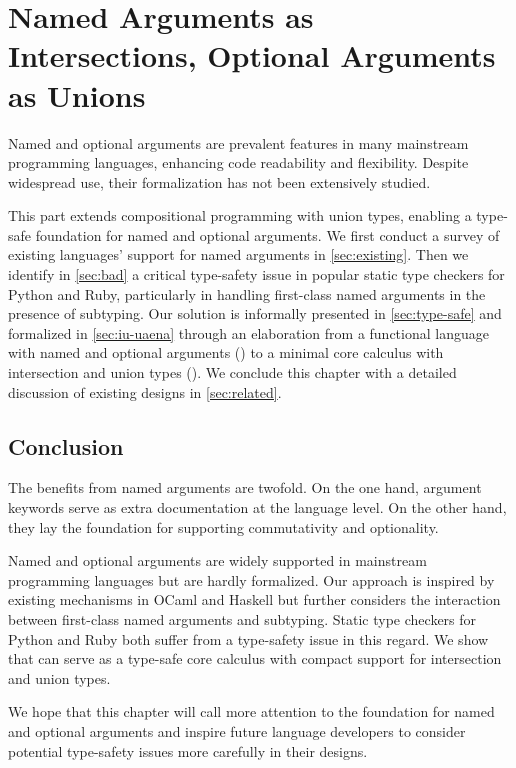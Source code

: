 \chapter{Named Arguments as Intersections, Optional Arguments as Unions} \label{ch:arguments}

Named and optional arguments are prevalent features in many mainstream
programming languages, enhancing code readability and flexibility. Despite
widespread use, their formalization has not been extensively studied.

This part extends compositional programming with union types, enabling a
type-safe foundation for named and optional arguments. We first conduct a survey
of existing languages' support for named arguments in \autoref{sec:existing}.
Then we identify in \autoref{sec:bad} a critical type-safety issue in popular
static type checkers for Python and Ruby, particularly in handling first-class
named arguments in the presence of subtyping. Our solution is informally
presented in \autoref{sec:type-safe} and formalized in \autoref{sec:iu-uaena}
through an elaboration from a functional language with named and optional
arguments (\uaena) to a minimal core calculus with intersection and union types
(\lambdaiu). We conclude this chapter with a detailed discussion of existing
designs in \autoref{sec:related}.







\section{Conclusion}

The benefits from named arguments are twofold. On the one hand, argument
keywords serve as extra documentation at the language level. On the other hand,
they lay the foundation for supporting commutativity and optionality.

Named and optional arguments are widely supported in mainstream programming
languages but are hardly formalized. Our approach is inspired by existing
mechanisms in OCaml and Haskell but further considers the interaction between
first-class named arguments and subtyping. Static type checkers for Python and
Ruby both suffer from a type-safety issue in this regard. We show that \lambdaiu
can serve as a type-safe core calculus with compact support for intersection and
union types.

We hope that this chapter will call more attention to the foundation for named
and optional arguments and inspire future language developers to consider
potential type-safety issues more carefully in their designs.
